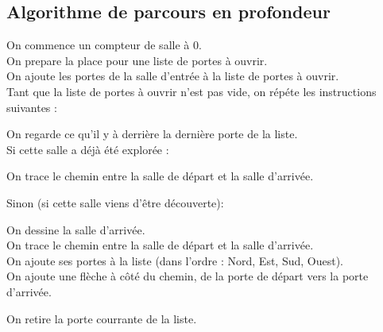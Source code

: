 \documentclass{article}
\begin{document}
        \subsection{Algorithme de parcours en profondeur}
            \label{AlgoProfondeur}
            \noindent
            On commence un compteur de salle à 0. \\
            On prepare la place pour une liste de portes à ouvrir. \\
            On ajoute les portes de la salle d'entrée à la liste de portes à ouvrir. \\
            Tant que la liste de portes à ouvrir n'est pas vide, on répéte les instructions suivantes :
            \begin{adjustwidth}{1cm}{}
                On regarde ce qu'il y à derrière la dernière porte de la liste. \\
                Si cette salle a déjà été explorée :
                \begin{adjustwidth}{1cm}{}
                    On trace le chemin entre la salle de départ et la salle d'arrivée.
                \end{adjustwidth}
                Sinon (si cette salle viens d'être découverte):
                \begin{adjustwidth}{1cm}{}
                    On dessine la salle d'arrivée.\\
                    On trace le chemin entre la salle de départ et la salle d'arrivée.\\
                    On ajoute ses portes à la liste (dans l'ordre : Nord, Est, Sud, Ouest).\\
                    On ajoute une flèche à côté du chemin, de la porte de départ vers la porte d'arrivée.
                \end{adjustwidth}
                On retire la porte courrante de la liste.
            \end{adjustwidth}
\end{document}
